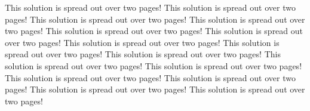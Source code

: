 \documentclass[answers]{exercises}
\begin{document}
\begin{questions}
	\begin{solution}
		This solution is spread out over two pages!
		This solution is spread out over two pages!
		This solution is spread out over two pages!
		This solution is spread out over two pages!
		This solution is spread out over two pages!
		This solution is spread out over two pages!
		This solution is spread out over two pages!
		This solution is spread out over two pages!
		This solution is spread out over two pages!
		This solution is spread out over two pages!
		This solution is spread out over two pages!
		This solution is spread out over two pages!
		This solution is spread out over two pages!
		This solution is spread out over two pages!
		This solution is spread out over two pages!
	\end{solution}
\end{questions}
\end{document}
